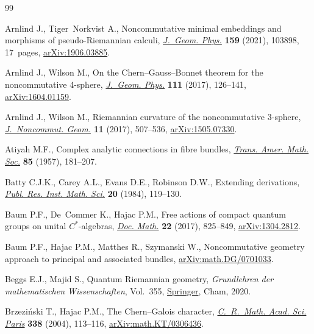\documentclass[pdftex]{sigma}
\numberwithin{equation}{section}
\begin{document}
\begin{thebibliography}{99}
\footnotesize\itemsep=0pt

Arnlind J., Tiger~Norkvist A., Noncommutative minimal embeddings and morphisms
 of pseudo-{R}iemannian calculi, \href{https://doi.org/10.1016/j.geomphys.2020.103898}{\textit{J.~Geom. Phys.}} \textbf{159} (2021),
 103898, 17~pages, \href{https://arxiv.org/abs/1906.03885}{arXiv:1906.03885}.

Arnlind J., Wilson M., On the {C}hern--{G}auss--{B}onnet theorem for the
 noncommutative 4-sphere, \href{https://doi.org/10.1016/j.geomphys.2016.10.016}{\textit{J.~Geom. Phys.}} \textbf{111} (2017),
 126--141, \href{https://arxiv.org/abs/1604.01159}{arXiv:1604.01159}.

Arnlind J., Wilson M., Riemannian curvature of the noncommutative 3-sphere,
 \href{https://doi.org/10.4171/JNCG/11-2-3}{\textit{J.~Noncommut. Geom.}} \textbf{11} (2017), 507--536,
 \href{https://arxiv.org/abs/1505.07330}{arXiv:1505.07330}.

Atiyah M.F., Complex analytic connections in fibre bundles, \href{https://doi.org/10.2307/1992969}{\textit{Trans.
 Amer. Math. Soc.}} \textbf{85} (1957), 181--207.

Batty C.J.K., Carey A.L., Evans D.E., Robinson D.W., Extending derivations,
 \href{https://doi.org/10.2977/prims/1195181832}{\textit{Publ. Res. Inst. Math. Sci.}} \textbf{20} (1984), 119--130.

Baum P.F., De~Commer K., Hajac P.M., Free actions of compact quantum groups on
 unital {$C^*$}-algebras, \href{https://doi.org/10.25537/dm.2017v22.825-849}{\textit{Doc. Math.}} \textbf{22} (2017), 825--849,
 \href{https://arxiv.org/abs/1304.2812}{arXiv:1304.2812}.

Baum P.F., Hajac P.M., Matthes R., Szymanski W., Noncommutative geometry
 approach to principal and associated bundles, \href{https://arxiv.org/abs/math.DG/0701033}{arXiv:math.DG/0701033}.

Beggs E.J., Majid S., Quantum {R}iemannian geometry, \textit{Grundlehren der
 mathematischen Wissenschaften}, Vol.~355, \href{https://doi.org/10.1007/978-3-030-30294-8}{Springer}, Cham, 2020.

Brzezi\'nski T., Hajac P.M., The {C}hern--{G}alois character,
 \href{https://doi.org/10.1016/j.crma.2003.11.009}{\textit{C.~R.~Math. Acad. Sci. Paris}} \textbf{338} (2004), 113--116,
 \href{https://arxiv.org/abs/math.KT/0306436}{arXiv:math.KT/0306436}.


\end{thebibliography}
\end{document}
